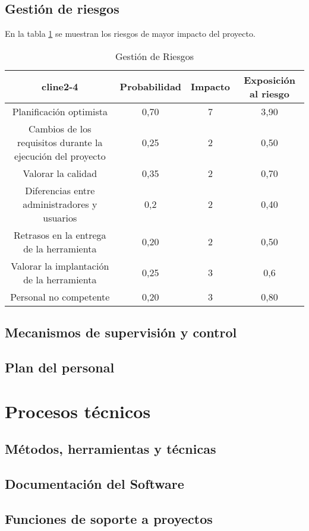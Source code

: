 \documentclass[11pt,a4paper,spanish,twoside]{report}
\begin{document}
\section{Gestión de riesgos}
En la tabla \ref{Tab:GestRi} se muestran los riesgos de mayor impacto del
proyecto. 
\begin{table}[!h]
\centering
\small
  \begin{tabular}{c|c|c|c}
    cline{2-4}
    & \textbf{Probabilidad} & \textbf{Impacto} &
    \textbf{Exposición al riesgo} \\
    \hline \hline
    Planificación optimista & 0,70 & 7 & 3,90 \\
    Cambios de los requisitos durante la ejecución del proyecto & 0,25 & 2 &
    0,50 \\
    Valorar la calidad & 0,35 & 2 & 0,70 \\
    Diferencias entre administradores y usuarios & 0,2 & 2 & 0,40 \\
    Retrasos en la entrega de la herramienta & 0,20 & 2 & 0,50 \\
    Valorar la implantación de la herramienta & 0,25 & 3 & 0,6 \\
    Personal no competente & 0,20 & 3 & 0,80 \\
  \end{tabular}
  \caption{Gestión de Riesgos} \label{Tab:GestRi}
\end{table}

\section{Mecanismos de supervisión y control}
\section{Plan del personal}

\chapter{Procesos técnicos}
\section{Métodos, herramientas y técnicas}
\section{Documentación del Software}
\section{Funciones de soporte a proyectos}
\end{document}
